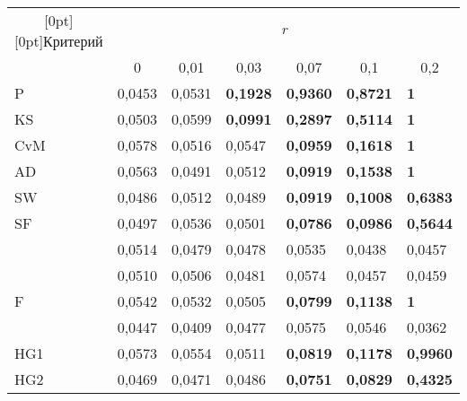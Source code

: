 \begin{table*}\small %
\begin{center}
\vspace*{2ex}

\begin{tabular}{|l|l|l|l|l|l|l|}
\hline
\multicolumn{1}{|c|}{\raisebox{-6pt}[0pt][0pt]{Критерий}}& \multicolumn{6}{c|}{$r$}\\
\cline{2-7}
&\multicolumn{1}{c|}{0}&\multicolumn{1}{c|}{0,01}&
\multicolumn{1}{c|}{0,03}&\multicolumn{1}{c|}{0,07}&\multicolumn{1}{c|}{0,1}&\multicolumn{1}{c|}{0,2}\\
\hline
\hspace*{4mm}P&0,0453&0,0531&{\bf 0,1928}&{\bf 0,9360}&{\bf 0,8721}&{\bf 1}\\
\hspace*{4mm}KS&0,0503&0,0599&{\bf 0,0991}&{\bf 0,2897}&{\bf 0,5114}&{\bf 1}\\
\hspace*{4mm}CvM&0,0578&0,0516&0,0547&{\bf 0,0959}&{\bf 0,1618}&{\bf 1}\\
\hspace*{4mm}AD&0,0563&0,0491&0,0512&{\bf 0,0919}&{\bf 0,1538}&{\bf 1}\\
\hspace*{4mm}SW&0,0486&0,0512&0,0489&{\bf 0,0919}&{\bf 0,1008}&{\bf 0,6383}\\
\hspace*{4mm}SF&0,0497&0,0536&0,0501&{\bf 0,0786}&{\bf 0,0986}&{\bf 0,5644}\\
\hspace*{4mm}{\bf JB}&0,0514&0,0479&0,0478&0,0535&0,0438&0,0457\\
\hspace*{4mm}{\bf AJB}&0,0510&0,0506&0,0481&0,0574&0,0457&0,0459\\
\hspace*{4mm}F&0,0542&0,0532&0,0505&{\bf 0,0799}&{\bf 0,1138}&{\bf 1}\\
\hspace*{4mm}{\bf G}&0,0447&0,0409&0,0477&0,0575&0,0546&0,0362\\
\hspace*{4mm}HG1&0,0573&0,0554&0,0511&{\bf 0,0819}&{\bf 0,1178}&{\bf 0,9960}\\
\hspace*{4mm}HG2&0,0469&0,0471&0,0486&{\bf 0,0751}&{\bf 0,0829}&{\bf 0,4325}\\

\end{tabular}
\end{center}
\end{table*}
